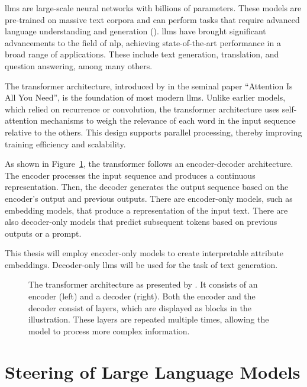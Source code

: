 \Acfp{llm} are large-scale neural networks with billions of parameters. These models are pre-trained on massive text corpora and can perform tasks that require advanced language understanding and generation (\cite{minaeeLargeLanguageModels2025}).
\acp{llm} have brought significant advancements to the field of \acl{nlp}, achieving state-of-the-art performance in a broad range of applications. These include text generation, translation, and question answering, among many others.

The transformer architecture, introduced by \citet{NIPS2017_3f5ee243} in the seminal paper \enquote{Attention Is All You Need}, is the foundation of most modern \acp{llm}. Unlike earlier models, which relied on recurrence or convolution, the transformer architecture uses self-attention mechanisms to weigh the relevance of each word in the input sequence relative to the others. This design supports parallel processing, thereby improving training efficiency and scalability.

As shown in Figure~\ref{fig:transformerArchitecture}, the transformer follows an encoder-decoder architecture. The encoder processes the input sequence and produces a continuous representation. Then, the decoder generates the output sequence based on the encoder's output and previous outputs. There are encoder-only models, such as embedding models, that produce a representation of the input text. There are also decoder-only models that predict subsequent tokens based on previous outputs or a prompt.

This thesis will employ encoder-only models to create interpretable attribute embeddings. Decoder-only \acp{llm} will be used for the task of text generation.

\begin{figure}[ht]
  \begin{center}
    
  \end{center}
  \caption{The transformer architecture as presented by \citet{NIPS2017_3f5ee243}. It consists of an encoder (left) and a decoder (right). Both the encoder and the decoder consist of layers, which are displayed as blocks in the illustration. These layers are repeated multiple times, allowing the model to process more complex information.}
  \label{fig:transformerArchitecture}
\end{figure}

\section{Steering of Large Language Models}
\label{sec:background:llm:steering}


